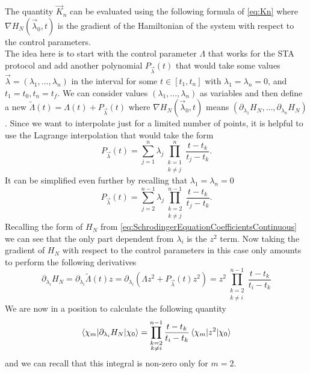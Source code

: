 The quantity $ \vec{ K }_{n} $ can be evaluated using the following formula of \cref{eq:Kn} where $ \nabla H_{N}(\vec{ \lambda }_{0}, t)$ is the gradient of the Hamiltonian of the system with respect to the control parameters.\\
The idea here is to start with the control parameter $ \Lambda $ that works for the STA protocol and add another polynomial $ P_{\vec{\lambda}}(t) $ that would take some values $ \vec{\lambda}  = (\lambda_{1},..., \lambda_{n})$ in the interval for some $ t \in [t_1, t_{n}] $ with $ \lambda_{1} = \lambda_{n} = 0 $, and $ t_{1}  = t_0 , t_{n} = t_{f} $.
We can consider values $ (\lambda_{1},..., \lambda_n) $ as variables and then define a new $ \tilde{\Lambda}(t) = \Lambda(t) +   P_{\vec{\lambda}}(t) $ where $ \nabla H_{N}(\vec{\lambda}_0,t) $ means $ (\partial_{\lambda_1} H_{N},..., \partial_{\lambda_n} H_{N}) $.
Since we want to interpolate just for a limited number of points, it is helpful to use the Lagrange interpolation that would take the form
\begin{equation}
	\label{eq:LagrangeInterpolationPolynomial}
	P_{\vec{ \lambda }}(t) = \sum_{j=1}^{n}\lambda_{j}\prod_{\substack{k=1\\k\neq j }}^{n}\frac{t-t_{k}}{t_{j} - t_{k}}.
\end{equation}
It can be simplified even further by recalling that $ \lambda_{1} = \lambda_{n} = 0 $
\begin{equation}
	\label{eq:LagrangeInterpolationPolynomialSimplified}
	P_{\vec{ \lambda }}(t) = \sum_{j=2}^{n-1}\lambda_{j}\prod_{\substack{k=2\\k\neq j }}^{n-1}\frac{t-t_{k}}{t_{j} - t_{k}}.
\end{equation}
Recalling the form of $   H_{N} $ from \cref{eq:SchrodingerEquationCoefficientsContinuous} we can see that the only part dependent from $ \lambda_{i} $ is the $ z^2 $ term.
Now taking the gradient of $ H_{N} $ with respect to the control parameters in this case only amounts to perform the following derivatives
\begin{equation}
	\label{eq:GradientLambda}
	\partial_{\lambda_i} H_{N}=\partial_{\lambda_i} \tilde{ \Lambda }(t)z = \partial_{\lambda_i} \left(\Lambda z^2 + P_{\vec{ \lambda }}(t)z^2    \right) =z^2\prod_{\substack{k=2\\k\neq i }}^{n-1}\frac{t-t_{k}}{t_{i} - t_{k}}
\end{equation}
We are now in a position to calculate the following quantity
\begin{equation}
	\label{eq:KnOverSpace}
	\braket{\chi_{m}|\partial_{\lambda_i} H_{N}|\chi_{0}} = \prod_{\substack{k=2\\k\neq i }}^{n-1}\frac{t-t_{k}}{t_{i} - t_{k}} \braket{\chi_{m}|z^2 |\chi_{0}}
\end{equation}
and we can recall that this integral is non-zero only for $ m = 2 $.
